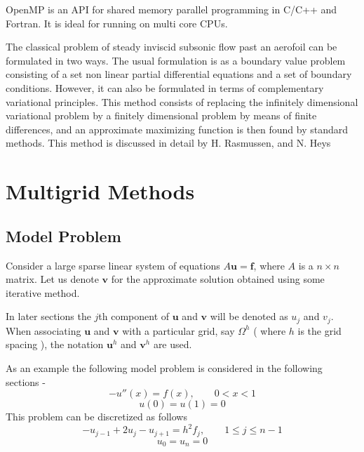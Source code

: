 \documentclass[a4paper]{report}
\begin{document}
	OpenMP is an API for shared memory parallel programming in C/C++ and Fortran. It is ideal for running on multi core CPUs.

	The classical problem of steady inviscid subsonic flow past an aerofoil can be formulated in two ways. 
	The usual formulation is as a boundary value problem consisting of a set non linear partial differential equations and a set of boundary conditions. 
	However, it can also be formulated in terms of complementary variational principles. 
	This method consists of replacing the infinitely dimensional variational problem by a finitely dimensional problem by means of finite differences, and an approximate maximizing function is then found by standard methods. This method is discussed in detail by H. Rasmussen, and N. Heys \cite{rasmussen}
	
	\chapter{Multigrid Methods}
	
	\section{Model Problem}
	Consider a large sparse linear system of equations $A \mathbf{u}=\mathbf{f}$, 
	where $A$ is a $n \times n$ matrix.
	Let us denote $\mathbf{v}$ for the approximate solution obtained using some iterative method.
	
	In later sections the $j$th component of $\mathbf{u}$ and $\mathbf{v}$ will be denoted as $u_j$ and $v_j$.
	When associating $\mathbf{u}$ and $\mathbf{v}$ with a particular grid, say $\Omega^h$ ( where $h$ is the grid spacing ), the notation $\mathbf{u}^h$ and $\mathbf{v}^h$ are used.
	
	As an example the following model problem is considered in the following sections -
	\begin{equation}
	\label{model}
	-u''(x) = f(x), \qquad 0<x<1
	\end{equation}
	\begin{equation}
	u(0) = u(1) = 0
	\end{equation}
	This problem can be discretized as follows
	\begin{equation}
	-u_{j-1} + 2u_j - u_{j+1} = h^2 f_j, \qquad 1 \leq j \leq n-1
	\end{equation}
	\begin{equation}
	u_0 = u_n = 0
	\end{equation}
	
\end{document}
